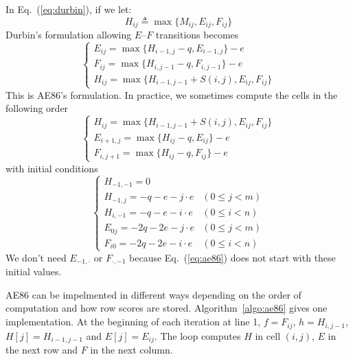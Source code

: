 \documentclass{bioinfo}
\begin{document}
\begin{methods}
In Eq.~(\ref{eq:durbin}), if we let:
\[H_{ij}\triangleq\max\{M_{ij},E_{ij},F_{ij}\}\]
Durbin's formulation allowing $E$--$F$ transitions becomes
\begin{equation}\label{eq:ae86-ori}
\left\{\begin{array}{l}
E_{ij}=\max\{H_{i-1,j}-q, E_{i-1,j}\} - e \\
F_{ij}=\max\{H_{i,j-1}-q, F_{i,j-1}\} - e \\
H_{ij}=\max\{H_{i-1,j-1}+S(i,j), E_{ij}, F_{ij}\}
\end{array}\right.
\end{equation}
This is AE86's formulation. In practice, we sometimes compute the cells in the
following order
\begin{equation}\label{eq:ae86}
\left\{\begin{array}{l}
H_{ij}=\max\{H_{i-1,j-1}+S(i,j), E_{ij}, F_{ij}\}\\
E_{i+1,j}=\max\{H_{ij}-q, E_{ij}\} - e \\
F_{i,j+1}=\max\{H_{ij}-q, F_{ij}\} - e
\end{array}\right.
\end{equation}
with initial conditions
\begin{equation}
\left\{\begin{array}{ll}
H_{-1,-1}=0\\
H_{-1,j}=-q-e-j\cdot e & (0\le j<m)\\
H_{i,-1}=-q-e-i\cdot e & (0\le i<n)\\
E_{0j}=-2q-2e-j\cdot e & (0\le j<m)\\
F_{i0}=-2q-2e-i\cdot e & (0\le i<n)
\end{array}\right.
\end{equation}
We don't need $E_{-1,\cdot}$ or $F_{\cdot,-1}$ because Eq.~(\ref{eq:ae86})
does not start with these initial values.

AE86 can be impelmented in different ways depending on the order of computation
and how row scores are stored. Algorithm~\ref{algo:ae86} gives one
implementation. At the beginning of each iteration at line 1, $f=F_{ij}$,
$h=H_{i,j-1}$, $H[j]=H_{i-1,j-1}$ and $E[j]=E_{ij}$. The loop computes
$H$ in cell $(i,j)$, $E$ in the next row and $F$ in the next column.


\end{methods}
\end{document}
